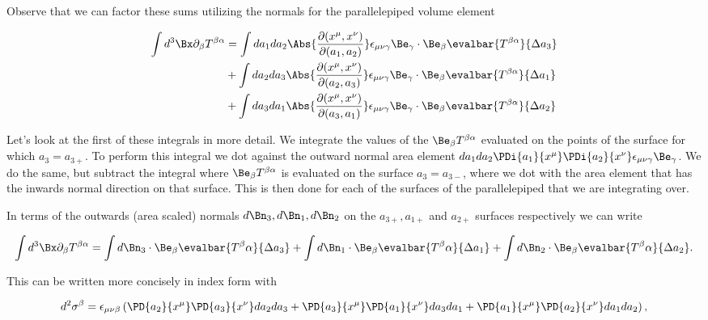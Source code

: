 Observe that we can factor these sums utilizing the normals for the parallelepiped volume element

\begin{align*}
\int d^3 \Bx \partial_\beta T^{\beta \alpha}
&=
\int da_1 da_2 
\Abs{ \frac{\partial(x^\mu, x^\nu)}{\partial (a_1, a_2)}} \epsilon_{\mu \nu \gamma} \Be_\gamma \cdot \Be_\beta
\evalbar{T^{\beta \alpha}}{\Delta a_3} \\
&+
\int da_2 da_3 
\Abs{ \frac{\partial(x^\mu, x^\nu)}{\partial (a_2, a_3)}} \epsilon_{\mu \nu \gamma} \Be_\gamma \cdot \Be_\beta
\evalbar{T^{\beta \alpha}}{\Delta a_1} \\
&+
\int da_3 da_1 
\Abs{ \frac{\partial(x^\mu, x^\nu)}{\partial (a_3, a_1)}} \epsilon_{\mu \nu \gamma} \Be_\gamma \cdot \Be_\beta
\evalbar{T^{\beta \alpha}}{\Delta a_2}
\end{align*}

Let's look at the first of these integrals in more detail.  We integrate the values of the $\Be_\beta T^{\beta \alpha}$ evaluated on the points of the surface for which $a_3 = a_{3+}$.  To perform this integral we dot against the outward normal area element $da_1 da_2 \PDi{a_1}{x^\mu} \PDi{a_2}{x^\nu} \epsilon_{\mu\nu\gamma} \Be_\gamma$.  We do the same, but subtract the integral where $\Be_\beta T^{\beta\alpha}$ is evaluated on the surface $a_3 = a_{3-}$, where we dot with the area element that has the inwards normal direction on that surface.  This is then done for each of the surfaces of the parallelepiped that we are integrating over.

In terms of the outwards (area scaled) normals $d\Bn_3, d\Bn_1, d\Bn_2$ on the $a_{3+}, a_{1+}$ and $a_{2+}$ surfaces respectively we can write

\begin{equation}\label{eqn:relativisticElectrodynamicsPS6:540}
\int d^3 \Bx \partial_\beta T^{\beta \alpha} = 
\int d\Bn_3 \cdot \Be_\beta \evalbar{T^{\beta}{\alpha}}{\Delta a_3}
+\int d\Bn_1 \cdot \Be_\beta \evalbar{T^{\beta}{\alpha}}{\Delta a_1}
+\int d\Bn_2 \cdot \Be_\beta \evalbar{T^{\beta}{\alpha}}{\Delta a_2}.
\end{equation}

This can be written more concisely in index form with

\begin{equation}\label{eqn:relativisticElectrodynamicsPS6:640}
d^2 \sigma^\beta = 
\epsilon_{\mu\nu\beta} \left(
\PD{a_2}{x^\mu}
\PD{a_3}{x^\nu} da_2 da_3
+\PD{a_3}{x^\mu}
\PD{a_1}{x^\nu} da_3 da_1
+\PD{a_1}{x^\mu}
\PD{a_2}{x^\nu} da_1 da_2
\right),
\end{equation}

